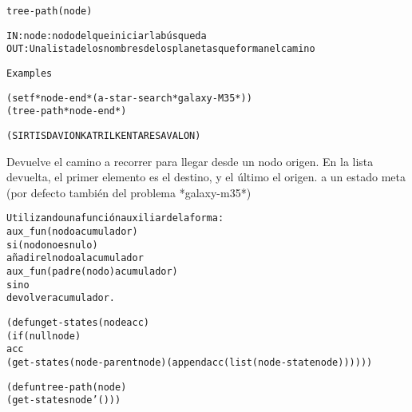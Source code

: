 \begin{aibox}{\function}
\begin{alltt}
tree-path (node)


   IN:node: nodo del que iniciar la búsqueda
   OUT: Una lista de los nombres de los planetas que forman el camino

\end{alltt}
\end{aibox}

\begin{aibox}{\examples}
\begin{alltt}
Examples 

(setf *node-end* (a-star-search *galaxy-M35*))
(tree-path *node-end*)

(SIRTIS DAVION KATRIL KENTARES AVALON)


\end{alltt}
\end{aibox}

\begin{aibox}{\comments}
   Devuelve el camino a recorrer para llegar desde un nodo origen. En la lista devuelta, el primer elemento es el destino, y el último el origen.
   a un estado meta (por defecto también del problema *galaxy-m35*)


\end{aibox}

\begin{aibox}{\pseudocode}
\begin{alltt}
   Utilizando una función auxiliar de la forma:
   aux\_fun (nodo acumulador)
       si (nodo no es nulo)
           añadir el nodo al acumulador
           aux\_fun(padre(nodo) acumulador)
       sino
           devolver acumulador.

\end{alltt}
\end{aibox}

\begin{aibox}{\code}
\begin{alltt}
(defun get-states (node acc)
    (if (null node)
        acc
        (get-states (node-parent node) (append acc (list (node-state node))))))

(defun tree-path (node)
    (get-states node '()))





\end{alltt}
\end{aibox}
